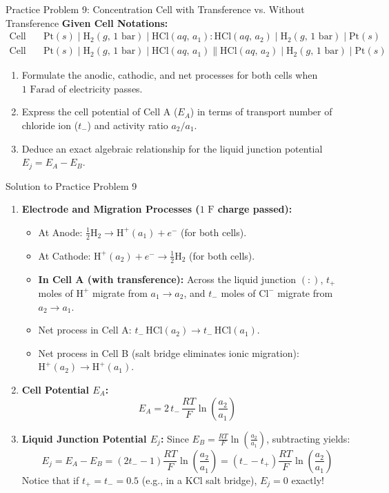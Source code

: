 \documentclass[10pt,a4paper]{article}
\begin{document}
\begin{exercisebox}{Practice Problem 9: Concentration Cell with Transference vs. Without Transference}
\textbf{Given Cell Notations:}
\begin{align*}
    \text{Cell A:} \quad & \text{Pt}(s) \mid \text{H}_2(g,\, 1\text{ bar}) \mid \text{HCl}(aq,\, a_1) : \text{HCl}(aq,\, a_2) \mid \text{H}_2(g,\, 1\text{ bar}) \mid \text{Pt}(s) \\
    \text{Cell B:} \quad & \text{Pt}(s) \mid \text{H}_2(g,\, 1\text{ bar}) \mid \text{HCl}(aq,\, a_1) \parallel \text{HCl}(aq,\, a_2) \mid \text{H}_2(g,\, 1\text{ bar}) \mid \text{Pt}(s)
\end{align*}
\begin{enumerate}[label=(\alph*)]
    \item Formulate the anodic, cathodic, and net processes for both cells when $1\text{ Farad}$ of electricity passes.
    \item Express the cell potential of Cell A ($E_A$) in terms of transport number of chloride ion ($t_-$) and activity ratio $a_2/a_1$.
    \item Deduce an exact algebraic relationship for the liquid junction potential $E_j = E_A - E_B$.
\end{enumerate}
\end{exercisebox}

\begin{solutionbox}{Solution to Practice Problem 9}
\begin{enumerate}[label=(\alph*)]
    \item \textbf{Electrode and Migration Processes ($1\text{ F}$ charge passed):}
    \begin{itemize}
        \item At Anode: $\tfrac{1}{2}\text{H}_2 \longrightarrow \text{H}^+(a_1) + e^-$ (for both cells).
        \item At Cathode: $\text{H}^+(a_2) + e^- \longrightarrow \tfrac{1}{2}\text{H}_2$ (for both cells).
        \item \textbf{In Cell A (with transference):} Across the liquid junction $(:)$, $t_+$ moles of $\text{H}^+$ migrate from $a_1 \to a_2$, and $t_-$ moles of $\text{Cl}^-$ migrate from $a_2 \to a_1$.
        \item Net process in Cell A: $t_-\,\text{HCl}(a_2) \longrightarrow t_-\,\text{HCl}(a_1)$.
        \item Net process in Cell B (salt bridge eliminates ionic migration): $\text{H}^+(a_2) \longrightarrow \text{H}^+(a_1)$.
    \end{itemize}
    \item \textbf{Cell Potential $E_A$:}
    $$E_A = 2\,t_-\,\frac{RT}{F}\ln\left(\frac{a_2}{a_1}\right)$$
    \item \textbf{Liquid Junction Potential $E_j$:}
    Since $E_B = \frac{RT}{F}\ln\left(\frac{a_2}{a_1}\right)$, subtracting yields:
    $$E_j = E_A - E_B = (2t_- - 1)\frac{RT}{F}\ln\left(\frac{a_2}{a_1}\right) = (t_- - t_+)\frac{RT}{F}\ln\left(\frac{a_2}{a_1}\right)$$
    Notice that if $t_+ = t_- = 0.5$ (e.g., in a $\text{KCl}$ salt bridge), $E_j = 0$ exactly!
\end{enumerate}
\end{solutionbox}
\end{document}
